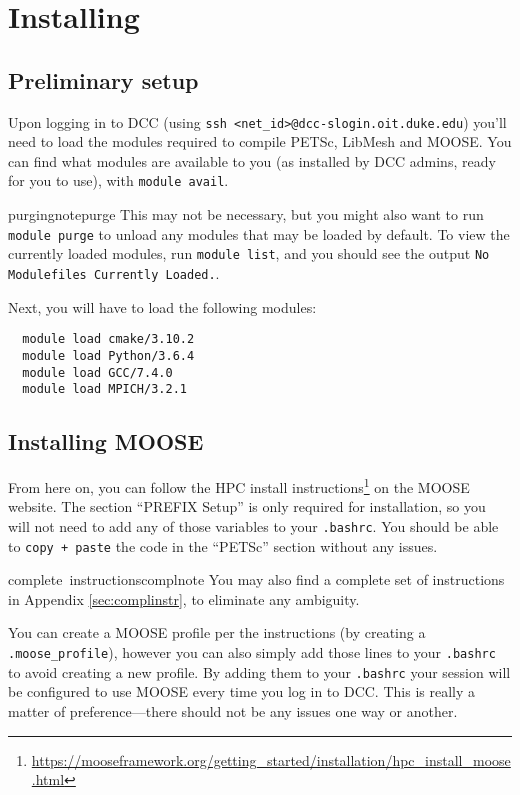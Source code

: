 \documentclass[class=Report, crop=false]{standalone}
\begin{document}
\section{Installing}

\subsection{Preliminary setup}
Upon logging in to DCC (using \texttt{ssh <net_id>@dcc-slogin.oit.duke.edu}) you'll need to load the modules required to compile PETSc, LibMesh and MOOSE. You can find what modules are available to you (as installed by DCC admins, ready for you to use), with \texttt{module avail}.

\begin{note}{purging}{notepurge}
  This may not be necessary, but you might also want to run \texttt{module purge} to unload any modules that may be loaded by default. To view the currently loaded modules, run \texttt{module list}, and you should see the output \texttt{No Modulefiles Currently Loaded.}.
\end{note}

Next, you will have to load the following modules:

\begin{verbatim}
  module load cmake/3.10.2
  module load Python/3.6.4
  module load GCC/7.4.0
  module load MPICH/3.2.1
\end{verbatim}

\subsection{Installing MOOSE}
From here on, you can follow the HPC install instructions\footnote{\url{https://mooseframework.org/getting_started/installation/hpc_install_moose.html}} on the MOOSE website. The section ``PREFIX Setup'' is only required for installation, so you will not need to add any of those variables to your \texttt{.bashrc}. You should be able to \texttt{copy + paste} the code in the ``PETSc'' section without any issues.

\begin{note}{complete~instructions}{complnote}
  You may also find a complete set of instructions in Appendix \ref{sec:complinstr}, to eliminate any ambiguity.
\end{note}

You can create a MOOSE profile per the instructions (by creating a \texttt{.moose_profile}), however you can also simply add those lines to your \texttt{.bashrc} to avoid creating a new profile. By adding them to your \texttt{.bashrc} your session will be configured to use MOOSE every time you log in to DCC. This is really a matter of preference---there should not be any issues one way or another.
\end{document}
